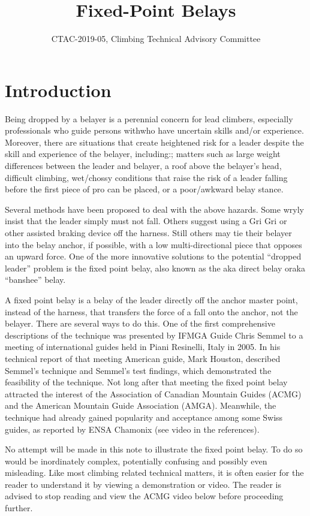 \documentclass[nonacm,acmtog]{acmart}
\title{Fixed-Point Belays}
\subtitle{CTAC-2019-05, Climbing Technical Advisory Committee}
\begin{document}
\maketitle

\section{Introduction}
Being dropped by a belayer is a perennial concern for lead climbers, especially
professionals who guide persons withwho have uncertain skills and/or
experience. Moreover, there are situations that create heightened risk for a
leader despite the skill and experience of the belayer, including:; matters
such as large weight differences between the leader and belayer, a roof above
the belayer’s head, difficult climbing, wet/chossy conditions that raise the
risk of a leader falling before the first piece of pro can be placed, or a
poor/awkward belay stance.

Several methods have been proposed to deal with the above hazards. Some wryly
insist that the leader simply must not fall. Others suggest using a Gri Gri or
other assisted braking device off the harness. Still others may tie their
belayer into the belay anchor, if possible, with a low multi-directional piece
that opposes an upward force. One of the more innovative solutions to the
potential “dropped leader” problem is the fixed point belay, also known as the
aka direct belay oraka “banshee” belay.

A fixed point belay is a belay of the leader directly off the anchor master
point, instead of the harness, that transfers the force of a fall onto the
anchor, not the belayer. There are several ways to do this. One of the first
comprehensive descriptions of the technique was presented by IFMGA Guide Chris
Semmel to a meeting of international guides held in Piani Resinelli, Italy in
2005. In his technical report of that meeting American guide, Mark Houston,
described Semmel’s technique and Semmel’s test findings, which demonstrated the
feasibility of the technique.  Not long after that meeting the fixed point
belay attracted the interest of the Association of Canadian Mountain Guides
(ACMG) and the American Mountain Guide Association (AMGA). Meanwhile, the
technique had already gained popularity and acceptance among some Swiss guides,
as reported by ENSA Chamonix (see video in the references).

No attempt will be made in this note to illustrate the fixed point belay. To do
so would be inordinately complex, potentially confusing and possibly even
misleading. Like most climbing related technical matters, it is often easier
for the reader to understand it by viewing a demonstration or video.  The
reader is advised to stop reading and view the ACMG video below before
proceeding further.
\end{document}
